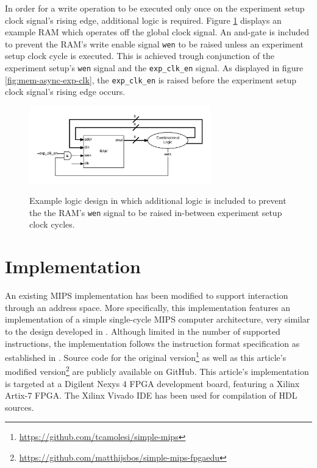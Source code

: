 \documentclass{article}
\begin{document}
In order for a write operation to be executed only once on the experiment setup clock signal's rising edge, additional logic is required. Figure \ref{fig:async-read-ram} displays an example RAM which operates off the global clock signal. An and-gate is included to prevent the RAM's write enable signal \texttt{wen} to be raised unless an experiment setup clock cycle is executed. This is achieved trough conjunction of the experiment setup's \texttt{wen} signal and the \texttt{exp\_clk\_en} signal. As displayed in figure \ref{fig:mem-async-exp-clk}, the \texttt{exp\_clk\_en} is raised before the experiment setup clock signal's rising edge occurs. 

\begin{figure}[h!]
    \centering
    \caption{Example logic design in which additional logic is included to prevent the the RAM's \texttt{wen} signal to be raised in-between experiment setup clock cycles.}
    \includegraphics[width=0.7\textwidth,trim=70px 70px 70px 70px, clip=true]{img/async-read-ram}
    \label{fig:async-read-ram}
\end{figure}


\newpage
\section{Implementation}
\label{section:implementation}
An existing MIPS implementation has been modified to support interaction through an address space. More specifically, this implementation features an implementation of a simple single-cycle MIPS computer architecture, very similar to the design developed in \cite[Sec. 4.4]{hennessy2013computer}. Although limited in the number of supported instructions, the implementation follows the instruction format specification as established in \cite[Ch. 2]{hennessy2013computer}. Source code for the original version\footnote{\url{https://github.com/tcamolesi/simple-mips}} as well as this article's modified version\footnote{\url{https://github.com/matthijsbos/simple-mips-fpgaedu}} are publicly available on GitHub. This article's implementation is targeted at a Digilent Nexys 4 FPGA development board, featuring a Xilinx Artix-7 FPGA. The Xilinx Vivado IDE has been used for compilation of HDL sources.
\end{document}
